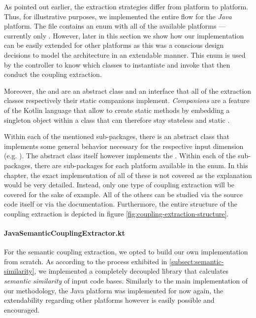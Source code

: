 \documentclass[12pt,a4paper]{report}
\begin{document}
As pointed out earlier, the extraction strategies differ from platform to platform.
Thus, for illustrative purposes, we implemented the entire flow for the \textit{Java}
platform. The  file contains an enum with all of the available
platforms --- currently only . However, later in this section we show
how our implementation can be easily extended for other platforms as this was a
conscious design decisions to model the architecture in an extendable manner.
This enum is used by the controller to know which classes to instantiate and invoke
that then conduct the coupling extraction.

Moreover, the  and  are an abstract
class and an interface that all of the extraction classes respectively their
static companions implement. \textit{Companions} are a feature of the Kotlin language
that allow to create static methods by embedding a singleton object within a class
that can therefore stay stateless and static \cite{kotlin-companions}.

Within each of the mentioned sub-packages, there is an abstract class that implements
some general behavior necessary for the respective input dimension
(e.g. ). The abstract class itself however
implements the .
Within each of the sub-packages, there are sub-packages for each platform available
in the  enum.
In this chapter, the exact implementation of all of these is not covered as the
explanation would be very detailed. Instead, only one type of coupling extraction
will be covered for the sake of example. All of the others can be studied via the
source code itself or via the documentation.
Furthermore, the entire structure of the coupling extraction is depicted in figure
\ref{fig:coupling-extraction-structure}.

\paragraph{JavaSemanticCouplingExtractor.kt}
For the semantic coupling extraction, we opted to build our own implementation
from scratch. As according to the process exhibited in \ref{subsect:semantic-similarity},
we implemented a completely decoupled library that calculates \textit{semantic similarity}
of input code bases. Similarly to the main implementation of our methodology,
the Java platform was implemented for now again, the extendability regarding other
platforms however is easily possible and encouraged.
\end{document}
